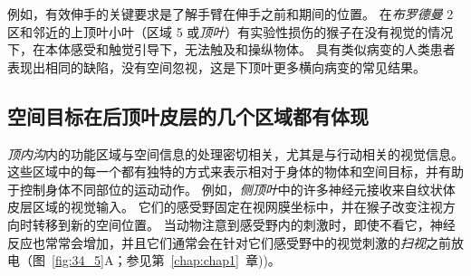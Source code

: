 例如，有效伸手的关键要求是了解手臂在伸手之前和期间的位置。
在\textit{布罗德曼} 2 区和邻近的上顶叶小叶（区域 5 或\textit{顶叶}）有实验性损伤的猴子在没有视觉的情况下，在本体感受和触觉引导下，无法触及和操纵物体。
具有类似病变的人类患者表现出相同的缺陷，没有空间忽视，这是下顶叶更多横向病变的常见结果。



\subsection{空间目标在后顶叶皮层的几个区域都有体现}

\textit{顶内沟}内的功能区域与空间信息的处理密切相关，尤其是与行动相关的视觉信息。
这些区域中的每一个都有独特的方式来表示相对于身体的物体和空间目标，并有助于控制身体不同部位的运动动作。
例如，\textit{侧顶叶}中的许多神经元接收来自纹状体皮层区域的视觉输入。
它们的感受野固定在视网膜坐标中，并在猴子改变注视方向时转移到新的空间位置。
当动物注意到感受野内的刺激时，即使不看它，神经反应也常常会增加，并且它们通常会在针对它们感受野中的视觉刺激的\textit{扫视}之前放电（图~\ref{fig:34_5}A；参见第~\ref{chap:chap1}~章))。



